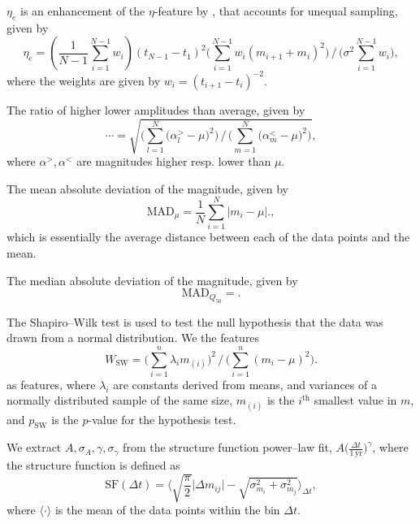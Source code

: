 \begin{enumerate}
 $\eta_e$ is an enhancement of the $\eta$-feature by \citet{kim2014}, that accounts for unequal sampling, given by
\begin{equation}\eta_e = (\frac{1}{N-1}\sum_{i=1}^{N-1} w_i) (t_{N-1} - t_1)^2 \big( \sum\limits_{i=1}^{N-1} w_i (m_{i+1} + m_i)^2 \big) \, / \, \big( \sigma^2 \sum\limits_{i=1}^{N-1} w_i \big),\end{equation}
where the weights are given by $w_i = (t_{i+1} - t_i)^{-2}$.

 The ratio of higher \resp lower amplitudes than average, given by
\begin{equation}\cdots = \sqrt{ \Big(\sum\limits_{l=1}^N \big( \alpha^{>}_l - \mu \big)^2\Big) \, / \, \Big(\sum\limits_{m=1}^N \big( \alpha^{<}_m - \mu \big)^2\Big)},\end{equation}
where $\alpha^{>}, \alpha^{<}$ are magnitudes higher resp. lower than $\mu$.

 The mean absolute deviation of the magnitude, given by
\begin{equation}\text{MAD}_{\mu} = \frac{1}{N} \sum\limits_{i=1}^{N} | m_i - \mu |.,\end{equation}
which is essentially the average distance between each of the data points and the mean.

 The median absolute deviation of the magnitude, given by
\begin{equation}\text{MAD}_{Q_{50}} = .\end{equation}

 The Shapiro--Wilk test \citep{shapiro1965} is used to test the null hypothesis that the data was drawn from a normal distribution. We the features
\begin{equation}W_{\text{SW}} = \big(\sum\limits_{i=1}^n \lambda_i m_{(i)}\big)^2 \, / \, \big(\sum\limits_{i=1}^n (m_i - \mu)^2\big).\end{equation}
as features, where $\lambda_i$ are constants derived from means, and variances of a normally distributed sample of the same size, $m_{(i)}$ is the $i^\text{th}$ smallest value in $m$, and $p_{\text{SW}}$ is the $p$-value for the hypothesis test.

 We extract $A, \sigma_A, \gamma, \sigma_\gamma$ from the structure function power--law fit, $A \big(\frac{\Delta t}{1 \, \mathrm{yr}}\big)^\gamma$, where the structure function is defined as
\begin{equation}\text{SF}(\Delta t) = \big\langle \sqrt{\frac{\pi}{2}} \big| \Delta m_{ij}  \big| - \sqrt{\sigma_{m_i}^2 + \sigma_{m_j}^2} \big\rangle_{\Delta t},\end{equation}
where $\langle \cdot \rangle$ is the mean of the data points within the bin $\Delta t$.


\end{enumerate}
